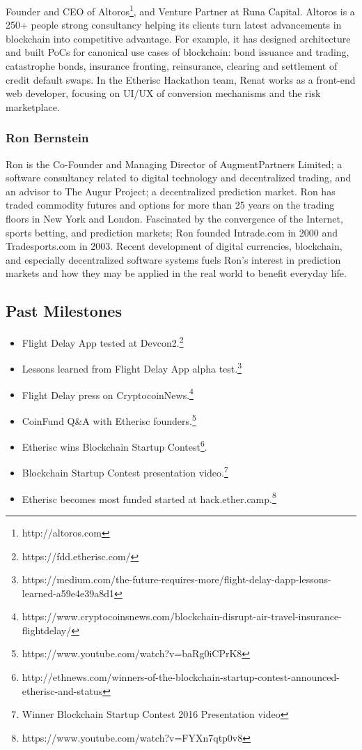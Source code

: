 \documentclass[12pt]{article}
\begin{document}
Founder and CEO of Altoros\footnote{http://altoros.com}, and Venture Partner at Runa Capital. Altoros is a 250+ people strong consultancy helping its clients turn latest advancements in blockchain into competitive advantage. For example, it has designed architecture and built PoCs for canonical use cases of blockchain: bond issuance and trading, catastrophe bonds, insurance fronting, reinsurance, clearing and settlement of credit default swaps. In the Etherisc Hackathon team, Renat works as a front-end web developer, focusing on UI/UX of conversion mechanisms and the risk marketplace.

\subsubsection{Ron Bernstein}

Ron is the Co-Founder and Managing Director of AugmentPartners Limited; a software consultancy related to digital technology and decentralized trading, and an advisor to The Augur Project; a decentralized prediction market. Ron has traded commodity futures and options for more than 25 years on the trading floors in New York and London. Fascinated by the convergence of the Internet, sports betting, and prediction markets; Ron founded Intrade.com in 2000 and Tradesports.com in 2003. Recent development of digital currencies, blockchain, and especially decentralized software systems fuels Ron’s interest in prediction markets and how they may be applied in the real world to benefit everyday life.

\subsection{Past Milestones}

\begin{itemize}
    \item Flight Delay App tested at Devcon2.\footnote{https://fdd.etherisc.com/}
    \item Lessons learned from Flight Delay App alpha test.\footnote{https://medium.com/the-future-requires-more/flight-delay-dapp-lessons-learned-a59e4e39a8d1}
    \item Flight Delay press on CryptocoinNews.\footnote{https://www.cryptocoinsnews.com/blockchain-disrupt-air-travel-insurance-flightdelay/}
    \item CoinFund Q\&A with Etherisc founders.\footnote{https://www.youtube.com/watch?v=baRg0iCPrK8}
    \item Etherisc wins Blockchain Startup Contest\footnote{http://ethnews.com/winners-of-the-blockchain-startup-contest-announced-etherisc-and-status}. 
    \item Blockchain Startup Contest presentation video.\footnote{Winner Blockchain Startup Contest 2016
Presentation video}
    \item Etherisc becomes most funded started at hack.ether.camp.\footnote{https://www.youtube.com/watch?v=FYXn7qtp0v8}
\end{itemize}
\end{document}

